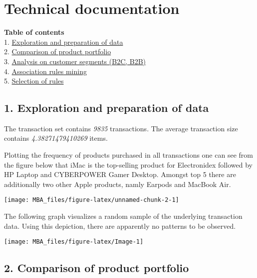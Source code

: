 \documentclass[]{article}
\begin{document}
\hypertarget{technical-documentation}{%
\section{Technical documentation}\label{technical-documentation}}

\textbf{Table of contents}\\
1.
\protect\hyperlink{Explorationux5cux2520andux5cux2520preparationux5cux2520ofux5cux2520data}{Exploration
and preparation of data}\\
2. \protect\hyperlink{Comparison}{Comparison of product portfolio}\\
3. \protect\hyperlink{Customerux5cux2520segments}{Analysis on customer
segments (B2C, B2B)}\\
4. \protect\hyperlink{Associationux5cux2520rules}{Association rules
mining}\\
5. \protect\hyperlink{Selectionux5cux2520ofux5cux2520rules}{Selection of
rules}

\hypertarget{exploration-and-preparation-of-data}{%
\subsection{1. Exploration and preparation of
data}\label{exploration-and-preparation-of-data}}

The transaction set contains \emph{9835} transactions. The average
transaction size contains \emph{4.38271479410269} items.

Plotting the frequency of products purchased in all transactions one can
see from the figure below that iMac is the top-selling product for
Electronidex followed by HP Laptop and CYBERPOWER Gamer Desktop. Amongst
top 5 there are additionally two other Apple products, namly Earpods and
MacBook Air.

\begin{center}\texttt{[image: MBA\_files/figure-latex/unnamed-chunk-2-1]} \end{center}

The following graph visualizes a random sample of the underlying
transaction data. Using this depiction, there are apparently no patterns
to be observed.

\begin{center}\texttt{[image: MBA\_files/figure-latex/Image-1]} \end{center}

\hypertarget{comparison-of-product-portfolio}{%
\subsection{2. Comparison of product
portfolio}\label{comparison-of-product-portfolio}}
\end{document}
